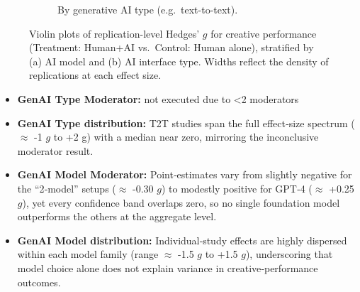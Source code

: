 \documentclass[manuscript, screen, review, acmsmall, anonymous]{acmart}
\begin{document}
\begin{figure}[H]
\begin{subfigure}[t]{0.49\linewidth}
    \caption{By generative AI type (e.g.\ text-to-text).}
    \label{fig:performance_raw_violin_genai_type}
  \end{subfigure}
  \caption{Violin plots of replication-level Hedges’ $g$ for creative performance (Treatment: Human+AI vs.\ Control: Human alone), stratified by (a) AI model and (b) AI interface type. Widths reflect the density of replications at each effect size.}
  \label{fig:performance_raw_violins_genai}
\end{figure}
\begin{itemize}
  \item \textbf{GenAI Type Moderator:} not executed due to <2 moderators
  \item \textbf{GenAI Type distribution:} T2T studies span the full effect‑size spectrum ($\approx$ -1 $g$ to +2 g) with a median near zero, mirroring the inconclusive moderator result.
  \item \textbf{GenAI Model Moderator:} Point‑estimates vary from slightly negative for the “2‑model” setups ($\approx$ -0.30 $g$) to modestly positive for GPT‑4 ($\approx$ +0.25 $g$), yet every confidence band overlaps zero, so no single foundation model outperforms the others at the aggregate level.
  \item \textbf{GenAI Model distribution:} Individual‐study effects are highly dispersed within each model family (range $\approx$ -1.5 $g$ to +1.5 $g$), underscoring that model choice alone does not explain variance in creative‑performance outcomes.
\end{itemize}
\end{document}
